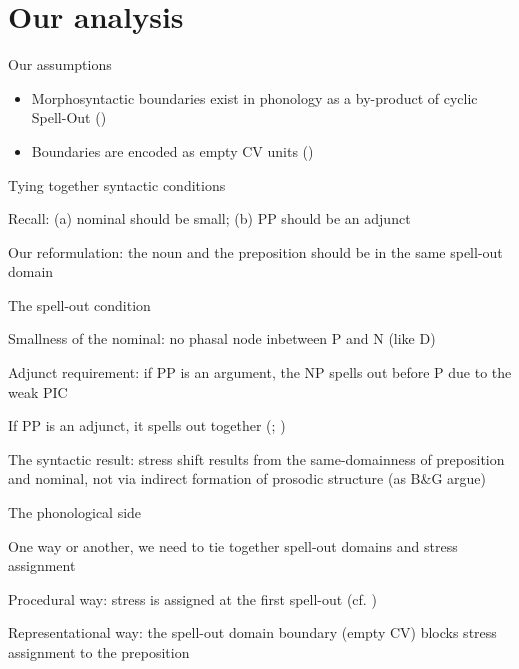 \documentclass{beamer}
\begin{document}
	\section{Our analysis}

	\begin{frame}{Our assumptions}

		\begin{itemize}
			\item Morphosyntactic boundaries exist in phonology as a by-product of cyclic Spell-Out (\cite{Scheer:2016})

			\item Boundaries are encoded as empty CV units (\cite{Scheer:2012})

		\end{itemize}

	\end{frame}

	\begin{frame}{Tying together syntactic conditions}

		Recall: (a) nominal should be small; (b) PP should be an adjunct

		Our reformulation: the noun and the preposition should be in the same spell-out domain

	\end{frame}

	\begin{frame}{The spell-out condition}

		Smallness of the nominal: no phasal node inbetween P and N (like D)

		Adjunct requirement: if PP is an argument, the NP spells out before P due to the weak PIC

		If PP is an adjunct, it spells out together (\cite{Stepanov:2007}; \cite{Privoznov:2021})

		The syntactic result: stress shift results from the same-domainness of preposition and nominal, not via indirect formation of prosodic structure (as B\&G argue)

	\end{frame}

	\begin{frame}{The phonological side}
	
		One way or another, we need to tie together spell-out domains and stress assignment

		Procedural way: stress is assigned at the first spell-out (cf. \cite{Marvin:2013})

		Representational way: the spell-out domain boundary (empty CV) blocks stress assignment to the preposition

	\end{frame}
\end{document}
